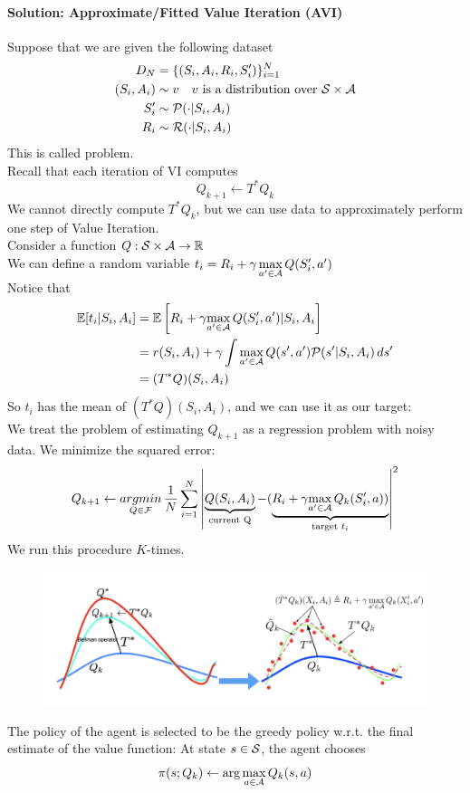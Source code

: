 \documentclass[11pt]{article}
\begin{document}
\paragraph{Solution: Approximate/Fitted Value Iteration (AVI)}
Suppose that we are given the following dataset
\begin{align}
	D_N &= \{(S_i, A_i, R_i, S'_i)\}_{i=1}^N \\
	(S_i, A_i) &\sim v \quad \text{$v$ is a distribution over $\mathcal{S} \times \mathcal{A}$} \\
	S'_i &\sim \mathcal{P}(\cdot|S_i, A_i) \\
	R_i &\sim \mathcal{R}(\cdot|S_i, A_i)
\end{align}
This is called  problem. \\
Recall that each iteration of VI computes
$$Q_{k+1} \gets T^*Q_k$$
We cannot directly compute $T^*Q_k$, but we can use data to approximately perform one step of Value Iteration. \\
Consider a function $Q: \mathcal{S} \times \mathcal{A} \rightarrow \mathbb{R}$ \\
We can define a random variable $t_i = R_i + \gamma\,\underset{a' \in \mathcal{A}}{\max}\, Q(S'_i, a')$ \\
Notice that 
\begin{align}
	\mathbb{E}[t_i|S_i, A_i] &= \mathbb{E}\left[ R_i + \gamma \underset{a' \in \mathcal{A}}{\max} \, Q(S'_i, a')|S_i, A_i \right] \\
	&= r(S_i, A_i) + \gamma \int \underset{a' \in \mathcal{A}}{\max}\, Q(s', a')\mathcal{P}(s'|S_i,A_i)\, ds' \\
	&= (T^*Q)(S_i, A_i) 
\end{align}
So $t_i$ has the mean of $(T^*Q)(S_i, A_i)$, and we can use it as our target:\\
We treat the problem of estimating $Q_{k+1}$ as a regression problem with noisy data. We minimize the squared error:
$$Q_{k+1} \leftarrow \underset{Q \in \mathcal{F}}{argmin} \, \frac{1}{N} \sum_{i=1}^N \left | \underbrace{Q(S_i, A_i)}_{\text{current Q}} - (\underbrace{R_i + \gamma \underset{a' \in \mathcal{A}}{\max} \, Q_k(S'_i, a))}_{\text{target $t_i$}}\right |^2$$
We run this procedure $K$-times.
\begin{figure}[H]
	\centering
	\includegraphics[scale=0.6]{p4.png}
\end{figure}
\noindent The policy of the agent is selected to be the greedy policy w.r.t. the final estimate of the value function: At state $s \in \mathcal{S}$, the agent chooses
$$\pi(s; Q_k) \gets \arg \max_{a\in \mathcal{A}} Q_k(s,a)$$
\end{document}
